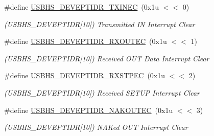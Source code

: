\begin{DoxyCompactItemize}
\mbox{\label{group__SAME70__USBHS_ga7b395bca7982f0492694c66539197454}} 
\#define \mbox{\hyperlink{group__SAME70__USBHS_ga7b395bca7982f0492694c66539197454}{U\+S\+B\+H\+S\+\_\+\+D\+E\+V\+E\+P\+T\+I\+D\+R\+\_\+\+T\+X\+I\+N\+EC}}~(0x1u $<$$<$ 0)
\begin{DoxyCompactList}\small\item\em (U\+S\+B\+H\+S\+\_\+\+D\+E\+V\+E\+P\+T\+I\+DR\mbox{[}10\mbox{]}) Transmitted IN Interrupt Clear \end{DoxyCompactList}\item 
\mbox{\label{group__SAME70__USBHS_ga3b95dfd74fd8bec25a27705437795a3c}} 
\#define \mbox{\hyperlink{group__SAME70__USBHS_ga3b95dfd74fd8bec25a27705437795a3c}{U\+S\+B\+H\+S\+\_\+\+D\+E\+V\+E\+P\+T\+I\+D\+R\+\_\+\+R\+X\+O\+U\+T\+EC}}~(0x1u $<$$<$ 1)
\begin{DoxyCompactList}\small\item\em (U\+S\+B\+H\+S\+\_\+\+D\+E\+V\+E\+P\+T\+I\+DR\mbox{[}10\mbox{]}) Received O\+UT Data Interrupt Clear \end{DoxyCompactList}\item 
\mbox{\label{group__SAME70__USBHS_ga18068a537cfad8da0c67350f65957253}} 
\#define \mbox{\hyperlink{group__SAME70__USBHS_ga18068a537cfad8da0c67350f65957253}{U\+S\+B\+H\+S\+\_\+\+D\+E\+V\+E\+P\+T\+I\+D\+R\+\_\+\+R\+X\+S\+T\+P\+EC}}~(0x1u $<$$<$ 2)
\begin{DoxyCompactList}\small\item\em (U\+S\+B\+H\+S\+\_\+\+D\+E\+V\+E\+P\+T\+I\+DR\mbox{[}10\mbox{]}) Received S\+E\+T\+UP Interrupt Clear \end{DoxyCompactList}\item 
\mbox{\label{group__SAME70__USBHS_ga129076516fd5a8e9f0067f014ac39e12}} 
\#define \mbox{\hyperlink{group__SAME70__USBHS_ga129076516fd5a8e9f0067f014ac39e12}{U\+S\+B\+H\+S\+\_\+\+D\+E\+V\+E\+P\+T\+I\+D\+R\+\_\+\+N\+A\+K\+O\+U\+T\+EC}}~(0x1u $<$$<$ 3)
\begin{DoxyCompactList}\small\item\em (U\+S\+B\+H\+S\+\_\+\+D\+E\+V\+E\+P\+T\+I\+DR\mbox{[}10\mbox{]}) N\+A\+Ked O\+UT Interrupt Clear \end{DoxyCompactList}\item 
\mbox{\label{group__SAME70__USBHS_ga421f5227963f7f012335278589732375}} 

\end{DoxyCompactItemize}
